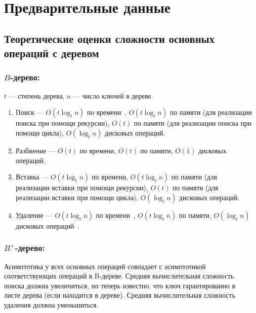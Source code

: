 \documentclass{llncs}
\begin{document}
    \vspace{-1em}

    \section{Предварительные данные}
    
    \vspace{-0.5em}
	
	\subsection{Теоретические оценки сложности основных операций с деревом}
	
	\vspace{-0.5em}
	
	\subsubsection{$B$-дерево:}
	
	$t$ --- степень дерева, $n$ --- число ключей в дереве.
	
	\begin{enumerate}
		\item Поиск --- $O(t\log_t n)$ по времени~\cite{Kormen}, $O(t\log_t n)$ по памяти (для реализации поиска при помощи рекурсии), $O(t)$ по памяти (для реализации поиска при помощи цикла), $O(\log_t n)$ дисковых операций.
		\item Разбиение --- $O(t)$ по времени, $O(t)$ по памяти, $O(1)$ дисковых операций.
		\item Вставка --- $O(t\log_t n)$ по времени, $O(t\log_t n)$ по памяти (для реализации вставки при помощи рекурсии), $O(t)$ по памяти (для реализации вставки при помощи цикла), $O(\log_t n)$ дисковых операций.
		\item Удаление --- $O(t\log_t n)$ по времени~\cite{Kormen}, $O(t\log_t n)$ по памяти, $O(\log_t n)$ дисковых операций~\cite{Kormen}.
	\end{enumerate}
    
    \vspace{-1em}
    
    \subsubsection{$B^+$-дерево:}
    
    Асимптотика у всех основных операций совпадает с асимптотикой соответствующих операций в B-дереве. Средняя вычислительная сложность поиска должна увеличиться, но теперь известно, что ключ гарантированно в листе дерева (если находится в дереве). Средняя вычислительная сложность удаления должна уменьшиться.
    
\end{document}
